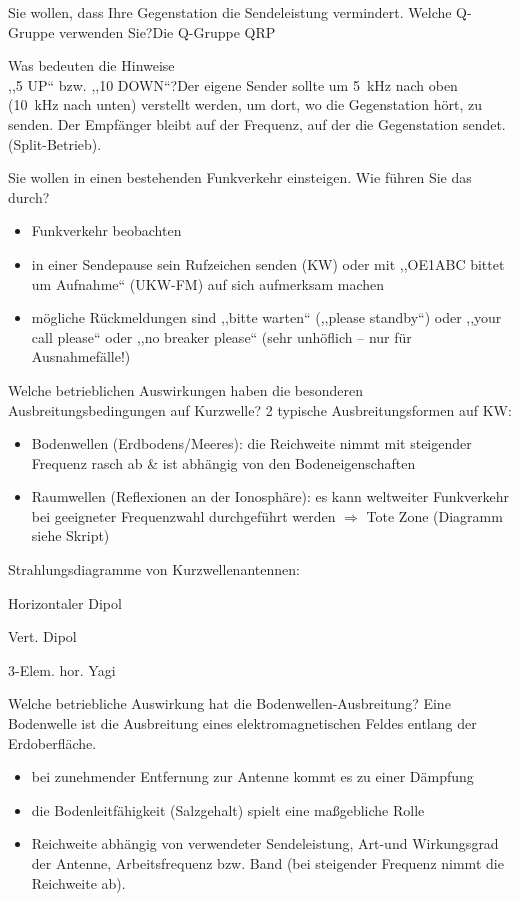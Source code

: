 \documentclass[avery5371,grid,frame,a4paper]{flashcards}
\newcommand{\card}[3]{
  \begin{flashcard}[{\chap} -- #1]{#2}#3\end{flashcard}
}
\begin{document}
\card{04}{Sie wollen, dass Ihre Gegenstation die Sendeleistung vermindert. Welche Q-Gruppe verwenden Sie?}{Die Q-Gruppe QRP}
\card{05}{Was bedeuten die Hinweise \\ ,,5 UP`` bzw. ,,10 DOWN``?}{Der eigene Sender sollte um 5~kHz nach oben (10~kHz nach unten) verstellt werden, um dort, wo die Gegenstation hört, zu senden. Der Empfänger bleibt auf der Frequenz, auf der die Gegenstation sendet. (Split-Betrieb).}
\card{06}{Sie wollen in einen bestehenden Funkverkehr einsteigen. Wie führen Sie das durch?}{
  \begin{itemize}
    \item Funkverkehr beobachten
    \item in einer Sendepause sein Rufzeichen senden (KW) oder mit ,,OE1ABC bittet um Aufnahme`` (UKW-FM) auf sich aufmerksam machen
    \item mögliche Rückmeldungen sind ,,bitte warten`` (,,please standby``) oder ,,your call please`` oder ,,no breaker please`` (sehr unhöflich – nur für Ausnahmefälle!)
  \end{itemize}
}
\card{07}{Welche betrieblichen Auswirkungen haben die besonderen Ausbreitungsbedingungen auf Kurzwelle?}{
  \small
  2 typische Ausbreitungsformen auf KW:
  \begin{itemize}
    \item Bodenwellen (Erdbodens/Meeres): die Reichweite nimmt mit steigender Frequenz rasch ab \& ist abhängig von den Bodeneigenschaften
    \item Raumwellen (Reflexionen an der Ionosphäre): es kann weltweiter Funkverkehr bei geeigneter Frequenzwahl durchgeführt werden $\Rightarrow$ Tote Zone (Diagramm siehe Skript)
  \end{itemize}

  Strahlungsdiagramme von Kurzwellenantennen: \\
  \begin{itemize*}
    \item Horizontaler Dipol
    \item Vert. Dipol
    \item 3-Elem. hor. Yagi
  \end{itemize*}
}
\card{08}{Welche betriebliche Auswirkung hat die Bodenwellen-Ausbreitung?}{
  \small
  Eine Bodenwelle ist die Ausbreitung eines elektromagnetischen Feldes entlang der Erdoberfläche.
  \begin{itemize}
    \item bei zunehmender Entfernung zur Antenne kommt es zu einer Dämpfung
    \item die Bodenleitfähigkeit (Salzgehalt) spielt eine maßgebliche Rolle
    \item Reichweite abhängig von verwendeter Sendeleistung, Art-und Wirkungsgrad der Antenne, Arbeitsfrequenz bzw. Band (bei steigender Frequenz nimmt die Reichweite ab).
  \end{itemize}
}
\end{document}
